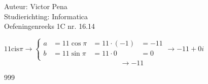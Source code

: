 \documentclass[a4paper]{article}
\begin{document}
	
\newcommand{\cis}{\text{cis}}
	
\noindent \large Auteur: Victor Pena \\
\noindent \large Studierichting: Informatica\\
\noindent \large Oefeningenreeks 1C nr. 16.14\\

\medskip

\normalsize

$11\cis\pi \rightarrow 
\left\{\begin{array}{llll}
	a &= 11\cos\pi &= 11\cdot(-1) &= -11\\
	b &= 11\sin\pi &= 11\cdot0  &= 0\\
\end{array}\right.
\rightarrow -11 + 0i$\\

$$\rightarrow -11$$


	
\begin{thebibliography}{999}
\end{thebibliography}
\end{document}
